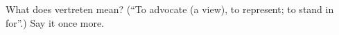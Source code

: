 \begin{tcolorbox}[breakable,colback=teal!4,colframe=teal!35!black,title={Before you move on}]
What does vertreten mean? (\textquotedblleft{}To advocate (a view), to represent; to stand in for\textquotedblright{}.) Say it once more.
\end{tcolorbox}
